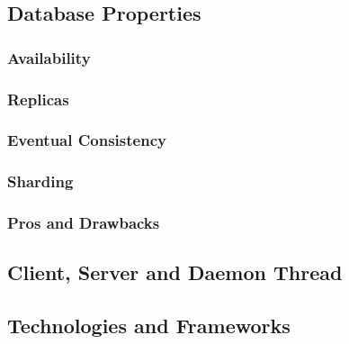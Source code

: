 \subsection{Database Properties}

\subsubsection{Availability}
\subsubsection{Replicas}
\subsubsection{Eventual Consistency}
\subsubsection{Sharding}
\subsubsection{Pros and Drawbacks}


\subsection{Client, Server and Daemon Thread}

\subsection{Technologies and Frameworks}

